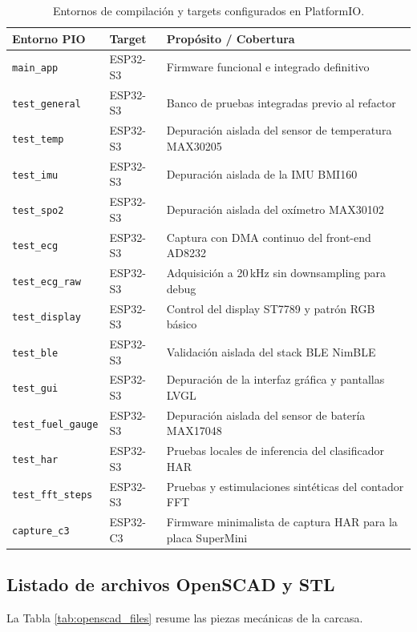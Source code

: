 \documentclass[letterpaper,11pt]{article}
\newcommand{\rtabla}[1]{Tabla \ref{#1}}
\begin{document}
\begin{table}[H]
\centering
\caption{Entornos de compilación y targets configurados en PlatformIO.}
\label{tab:pio_envs}
\small
\begin{tabular}{lll}
\toprule
\textbf{Entorno PIO} & \textbf{Target} & \textbf{Propósito / Cobertura} \\
\midrule
\texttt{main\_app} & ESP32-S3 & Firmware funcional e integrado definitivo \\
\texttt{test\_general} & ESP32-S3 & Banco de pruebas integradas previo al refactor \\
\texttt{test\_temp} & ESP32-S3 & Depuración aislada del sensor de temperatura MAX30205 \\
\texttt{test\_imu} & ESP32-S3 & Depuración aislada de la IMU BMI160 \\
\texttt{test\_spo2} & ESP32-S3 & Depuración aislada del oxímetro MAX30102 \\
\texttt{test\_ecg} & ESP32-S3 & Captura con DMA continuo del front-end AD8232 \\
\texttt{test\_ecg\_raw} & ESP32-S3 & Adquisición a 20\,kHz sin downsampling para debug \\
\texttt{test\_display} & ESP32-S3 & Control del display ST7789 y patrón RGB básico \\
\texttt{test\_ble} & ESP32-S3 & Validación aislada del stack BLE NimBLE \\
\texttt{test\_gui} & ESP32-S3 & Depuración de la interfaz gráfica y pantallas LVGL \\
\texttt{test\_fuel\_gauge} & ESP32-S3 & Depuración aislada del sensor de batería MAX17048 \\
\texttt{test\_har} & ESP32-S3 & Pruebas locales de inferencia del clasificador HAR \\
\texttt{test\_fft\_steps} & ESP32-S3 & Pruebas y estimulaciones sintéticas del contador FFT \\
\texttt{capture\_c3} & ESP32-C3 & Firmware minimalista de captura HAR para la placa SuperMini \\
\bottomrule
\end{tabular}
\end{table}

\newpage

\subsection{Listado de archivos OpenSCAD y STL}\label{sec:anexo_openscad}

La \rtabla{tab:openscad_files} resume las piezas mecánicas de la carcasa.
\end{document}
